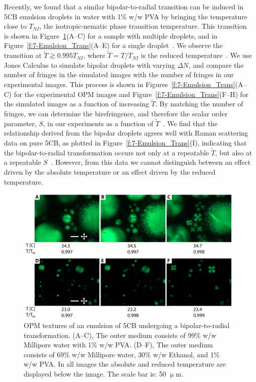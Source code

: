 Recently, we found that a similar bipolar-to-radial transition can be induced in 5CB emulsion droplets in water with 1\% w/w PVA by bringing the temperature close to $T_{NI}$, the isotropic-nematic phase transition temperature.
This transition is shown in Figure~\ref{f:7-Emulsion_Eth}(A--C) for a sample with multiple droplets, and in Figure~\ref{f:7-Emulsion_Trans}(A--E) for a single droplet~\cite{nayani2017role}.
We observe the transition at $\tilde{T} \gtrsim 0.995 T_{NI}$, where $\tilde{T} = T/T_{NI}$ is the reduced temperature~\cite{nayani2017role}.
We use Jones Calculus to simulate bipolar droplets with varying $\Delta N$, and compare the number of fringes in the simulated images with the number of fringes in our experimental images.
This process is shown in Figures~\ref{f:7-Emulsion_Trans}(A--C) for the experimental OPM images and Figure~\ref{f:7-Emulsion_Trans}(F--H) for the simulated images as a function of increasing $\tilde{T}$.
By matching the number of fringes, we can determine the birefringence, and therefore the scalar order parameter, $S$, in our experiments as a function of $\tilde{T}$~\cite{nayani2017role}.
We find that the relationship derived from the bipolar droplets agrees well with Raman scattering data on pure 5CB, as plotted in Figure~\ref{f:7-Emulsion_Trans}(I), indicating that the bipolar-to-radial transformation occurs not only at a repeatable $\tilde{T}$, but also at a repeatable $S$~\cite{nayani2017role}.
However, from this data we cannot distinguish between an effect driven by the absolute temperature or an effect driven by the reduced temperature.
\begin{figure}
  \centering
  \includegraphics{figures/C7/Ch7-Figs_Emulsion_Eth.png}
  \caption{OPM textures of an emulsion of 5CB undergoing a bipolar-to-radial transformation.
      (A--C), The outer medium consists of 99\% w/w Millipore water with 1\% w/w PVA.
      (D--F), The outer medium consists of 69\% w/w Millipore water, 30\% w/w Ethanol, and 1\% w/w PVA.
      In all images the absolute and reduced temperature are displayed below the image.
      The scale bar is: 50 $\upmu$m.
      }\label{f:7-Emulsion_Eth}
\end{figure}


